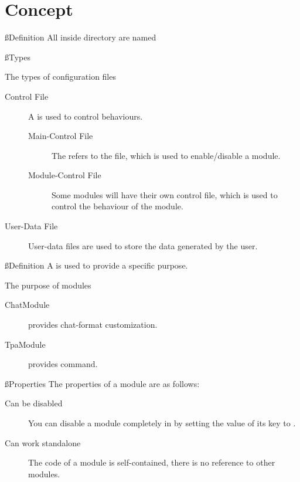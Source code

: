 \chapter{Concept}\label{ch:concept}

\ss{Definition}
All  inside  directory are named 

\ss{Types}
\begin{note}{The types of configuration files}
    \begin{description}
        \item[Control File] {A  is used to control behaviours.}
        \begin{description}
            \item[Main-Control File] The  refers to the  file, which is used to enable/disable a module.
            \item[Module-Control File] Some modules will have their own control file, which is used to control the behaviour of the module.
        \end{description}

        \item[User-Data File] User-data files are used to store the data generated by the user.
    \end{description}
\end{note}


\clearpage
{}

\ss{Definition}
A  is used to provide a specific purpose.
\begin{example}{The purpose of modules}
    \begin{description}
        \item [ChatModule] provides chat-format customization.
        \item [TpaModule] provides  command.
    \end{description}
\end{example}

\ss{Properties}
The properties of a module are as follows:
\begin{description}
    \item [Can be disabled] You can disable a module completely in  by setting the value of its  key to .
    \item [Can work standalone] The code of a module is self-contained, there is no reference to other modules.
\end{description}

